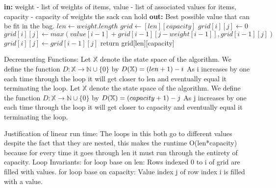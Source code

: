 \documentclass{article}
\newcommand{\N}{\mathbb{N}}
\begin{document}
\begin{enumerate}
    \begin{algorithm}
    \begin{algorithmic}
    \newline
    	\textbf{in: } weight - list of weights of items, value - list of associated values for items, capacity - capacity of weights the sack can hold\newline
	\textbf{out: } Best possible value that can be fit in the bag.
	\State $len \gets weight.length$
	\State $grid \gets [len][capacity]$
			 
				\State $grid[i][j] \gets 0$
				\State $grid[i][j] \gets max(value[i-1] + grid[i-1][j-weight[i-1]], grid[i-1][j])$
			\Else
				\State $grid[i][j] \gets grid[i-1][j]$ 
			\EndIf
		\EndFor
	\EndFor
	\State return grid[len][capacity]
    \EndProcedure
    \end{algorithmic}
    \end{algorithm}
	    Decrementing Functions: \newline
     Let $\mathbb{X}$ denote the state space of the algorithm. We define the function $D \colon \mathbb{X} \to \N \cup \{0\}$ by $D( \mathbb{X}) = (len+1) -i\newline $
     As i increases by one each time through the loop it will get closer to len and eventually equal it terminating the loop.
       Let $\mathbb{X}$ denote the state space of the algorithm. We define the function $D \colon \mathbb{X} \to \N \cup \{0\}$ by $D( \mathbb{X}) = (capacity+1) -j\newline $
     As j increases by one each time through the loop it will get closer to capacity and eventually equal it terminating the loop.
 
     Justification of linear run time: \newline
     The loops in this both go to different values despite the fact that they are nested, this makes the runtime O(len*capacity) because for every time it goes through len it must run through the entirety of capacity.
    Loop Invariants:\newline
    for loop base on len: Rows indexed 0 to i of grid are filled with values.
    \newline
    for loop base on capacity: Value index j  of row index i is filled with a value.
    
          
\end{enumerate}
\end{document}
